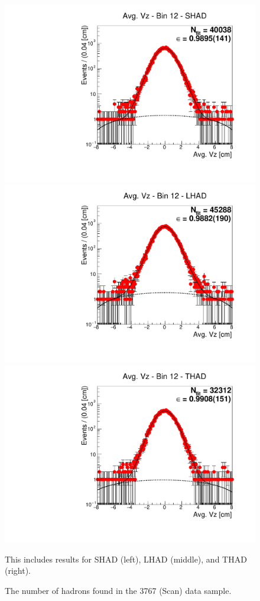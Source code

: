 \begin{figure}[H]
\centering
\includegraphics[scale=0.25]{figures/plots/nonDDbar_fit_results/scan/fit_scan_12_data_SHAD.pdf}
\hspace{-0.5cm}
\includegraphics[scale=0.25]{figures/plots/nonDDbar_fit_results/scan/fit_scan_12_data_LHAD.pdf}
\hspace{-0.5cm}
\includegraphics[scale=0.25]{figures/plots/nonDDbar_fit_results/scan/fit_scan_12_data_THAD.pdf}
\caption{The number of hadrons found in the 3767 (Scan) data sample.}
{This includes results for SHAD (left), LHAD (middle), and THAD (right).}
\label{fig:hadron_fits_scan_12}
\end{figure}

